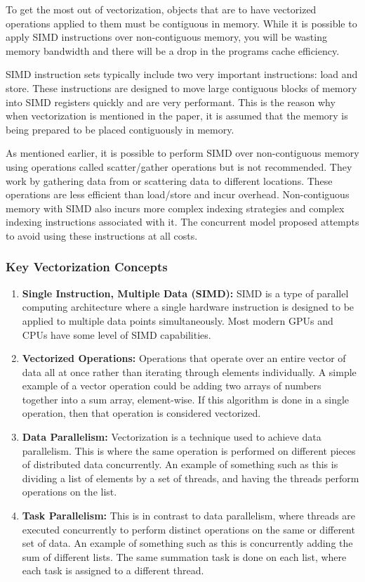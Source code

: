 To get the most out of vectorization, objects that are to have vectorized operations applied to them must be contiguous in memory. While it is possible to apply SIMD instructions over non-contiguous memory, you will be wasting memory bandwidth and there will be a drop in the programs cache efficiency. 

SIMD instruction sets typically include two very important instructions: load and store. These instructions are designed to move large contiguous blocks of memory into SIMD registers quickly and are very performant. This is the reason why when vectorization is mentioned in the paper, it is assumed that the memory is being prepared to be placed contiguously in memory. 

As mentioned earlier, it is possible to perform SIMD over non-contiguous memory using operations called scatter/gather operations but is not recommended. They work by gathering data from or scattering data to different locations. These operations are less efficient than load/store and incur overhead. Non-contiguous memory with SIMD also incurs more complex indexing strategies and complex indexing instructions associated with it. The concurrent model proposed attempts to avoid using these instructions at all costs. \cite{Kusswurm_2022}

\subsubsection{Key Vectorization Concepts}
\begin{enumerate}
    \item \textbf{Single Instruction, Multiple Data (SIMD):} SIMD is a type of parallel computing architecture where a single hardware instruction is designed to be applied to multiple data points simultaneously. Most modern GPUs and CPUs have some level of SIMD capabilities.
    \item \textbf{Vectorized Operations:} Operations that operate over an entire vector of data all at once rather than iterating through elements individually. A simple example of a vector operation could be adding two arrays of numbers together into a sum array, element-wise. If this algorithm is done in a single operation, then that operation is considered vectorized.
    \item \textbf{Data Parallelism:} Vectorization is a technique used to achieve data parallelism. This is where the same operation is performed on different pieces of distributed data concurrently. An example of something such as this is dividing a list of elements by a set of threads, and having the threads perform operations on the list. 
    \item \textbf{Task Parallelism:} This is in contrast to data parallelism, where threads are executed concurrently to perform distinct operations on the same or different set of data. An example of something such as this is concurrently adding the sum of different lists. The same summation task is done on each list, where each task is assigned to a different thread. 
\end{enumerate}

